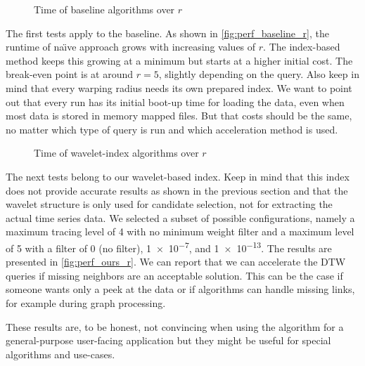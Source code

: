 \begin{figure}
    \centering
    
    \caption{Time of baseline algorithms over $r$}\label{fig:perf_baseline_r}
\end{figure}

The first tests apply to the baseline. As shown in \autoref{fig:perf_baseline_r}, the runtime of na{\"\i}ve approach grows with increasing values of $r$. The index-based method keeps this growing at a minimum but starts at a higher initial cost. The break-even point is at around $r = 5$, slightly depending on the query. Also keep in mind that every warping radius needs its own prepared index. We want to point out that every run has its initial boot-up time for loading the data, even when most data is stored in memory mapped files. But that costs should be the same, no matter which type of query is run and which acceleration method is used.

\begin{figure}
    \centering
    
    \caption{Time of wavelet-index algorithms over $r$}\label{fig:perf_ours_r}
\end{figure}

The next tests belong to our wavelet-based index. Keep in mind that this index does not provide accurate results as shown in the previous section and that the wavelet structure is only used for candidate selection, not for extracting the actual time series data. We selected a subset of possible configurations, namely a maximum tracing level of \num{4} with no minimum weight filter and a maximum level of \num{5} with a filter of \num{0} (no filter), \num{1e-7}, and \num{1e-13}. The results are presented in \autoref{fig:perf_ours_r}. We can report that we can accelerate the DTW queries if missing neighbors are an acceptable solution. This can be the case if someone wants only a peek at the data or if algorithms can handle missing links, for example during graph processing.

These results are, to be honest, not convincing when using the algorithm for a general-purpose user-facing application but they might be useful for special algorithms and use-cases.
